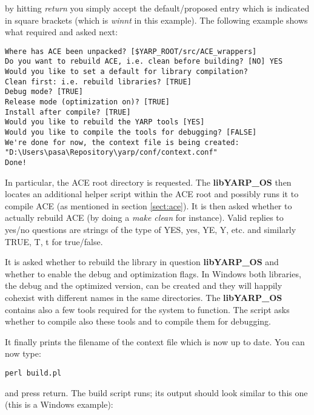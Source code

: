 \noindent by hitting {\em return} you simply accept the default/proposed entry which is indicated in square brackets (which is {\em winnt} in this example). The following example shows what required and asked next:

\begin{verbatim}
Where has ACE been unpacked? [$YARP_ROOT/src/ACE_wrappers]
Do you want to rebuild ACE, i.e. clean before building? [NO] YES
Would you like to set a default for library compilation?
Clean first: i.e. rebuild libraries? [TRUE]
Debug mode? [TRUE]
Release mode (optimization on)? [TRUE]
Install after compile? [TRUE]
Would you like to rebuild the YARP tools [YES]
Would you like to compile the tools for debugging? [FALSE]
We're done for now, the context file is being created: 
"D:\Users\pasa\Repository\yarp/conf/context.conf"
Done!
\end{verbatim}

In particular, the ACE root directory is requested. The {\bf libYARP\_OS} then locates an additional helper script within the ACE root and possibly runs it to compile ACE (as mentioned in section \ref{sect:ace}). It is then asked whether to actually rebuild ACE (by doing a {\em make clean} for instance). Valid replies to yes/no questions are strings of the type of YES, yes, YE, Y, etc. and similarly TRUE, T, t for true/false.

It is asked whether to rebuild the library in question {\bf libYARP\_OS} and whether to enable the debug and optimization flags. In Windows both libraries, the debug and the optimized version, can be created and they will happily cohexist with different names in the same directories. The {\bf libYARP\_OS} contains also a few tools required for the system to function. The script asks whether to compile also these tools and to compile them for debugging.

It finally prints the filename of the context file which is now up to date. You can now type:

\begin{verbatim}
perl build.pl
\end{verbatim}

and press return. The build script runs; its output should look similar to this one (this is a Windows example):

